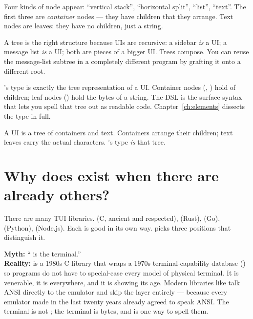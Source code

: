 Four kinds of node appear: ``vertical stack'', ``horizontal split'',
``list'', ``text''. The first three are \emph{container} nodes ---
they have children that they arrange. Text nodes are leaves: they
have no children, just a string.

A tree is the right structure because UIs are recursive: a sidebar
\emph{is} a UI; a message list \emph{is} a UI; both are pieces of a
bigger UI. Trees compose. You can reuse the message-list subtree in
a completely different program by grafting it onto a different root.

\maya{}'s  type is exactly the tree representation of
a UI. Container nodes (, ) hold
 of children; leaf nodes
() hold the bytes of a string. The DSL is the
surface syntax that lets you spell that tree out as readable \cpp{}
code. Chapter~\ref{ch:elements} dissects the  type in
full.

\begin{idea}
A UI is a tree of containers and text. Containers arrange their
children; text leaves carry the actual characters. \maya{}'s
 type \emph{is} that tree.
\end{idea}

\section{Why does \maya{} exist when there are already others?}

There are many TUI libraries.  (C, ancient and
respected),  (Rust),  (Go),
 (Python),  (Node.js). Each is good in its
own way. \maya{} picks three positions that distinguish it.

\begin{mythbust}
\textbf{Myth:} `` is the terminal.''\\
\textbf{Reality:}  is a 1980s C library that wraps a
1970s terminal-capability database () so programs do
not have to special-case every model of physical terminal. It is
venerable, it is everywhere, and it is showing its age. Modern
libraries like \maya{} talk ANSI directly to the emulator and skip
the  layer entirely --- because every emulator made
in the last twenty years already agreed to speak ANSI. The terminal
is not ; the terminal is bytes, and  is
one way to spell them.
\end{mythbust}


